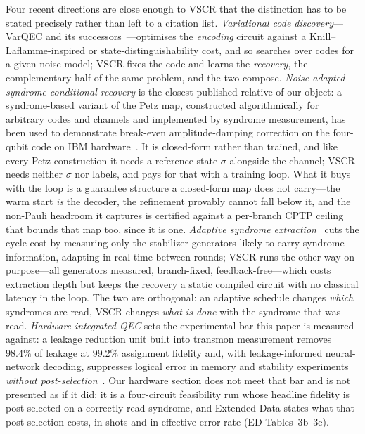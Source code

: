 \documentclass[aps,prxquantum,reprint,superscriptaddress]{revtex4-2}
\begin{document}
Four recent directions are close enough to VSCR that the distinction has to be
stated precisely rather than left to a citation list. \emph{Variational code
discovery}---VarQEC and its successors~\cite{varqec_cao,varqec_meyer}---optimises
the \emph{encoding} circuit against a Knill--Laflamme-inspired or
state-distinguishability cost, and so searches over codes for a given noise
model; VSCR fixes the code and learns the \emph{recovery}, the complementary half
of the same problem, and the two compose. \emph{Noise-adapted syndrome-conditional
recovery} is the closest published relative of our object: a syndrome-based
variant of the Petz map, constructed algorithmically for arbitrary codes and
channels and implemented by syndrome measurement, has been used to demonstrate
break-even amplitude-damping correction on the four-qubit code on IBM
hardware~\cite{biswas_syndrome_petz}. It is closed-form rather than trained, and
like every Petz construction it needs a reference state $\sigma$ alongside the
channel; VSCR needs neither $\sigma$ nor labels, and pays for that with a training
loop. What it buys with the loop is a guarantee structure a closed-form map does
not carry---the warm start \emph{is} the decoder, the refinement provably cannot
fall below it, and the non-Pauli headroom it captures is certified against a
per-branch CPTP ceiling that bounds that map too, since it is one.
\emph{Adaptive syndrome extraction}~\cite{berthusen_ase} cuts the cycle cost by
measuring only the stabilizer generators likely to carry syndrome information,
adapting in real time between rounds; VSCR runs the other way on purpose---all
generators measured, branch-fixed, feedback-free---which costs extraction depth
but keeps the recovery a static compiled circuit with no classical latency in the
loop. The two are orthogonal: an adaptive schedule changes \emph{which} syndromes
are read, VSCR changes \emph{what is done} with the syndrome that was read.
\emph{Hardware-integrated QEC} sets the experimental bar this paper is measured
against: a leakage reduction unit built into transmon measurement removes
$98.4\%$ of leakage at $99.2\%$ assignment fidelity and, with leakage-informed
neural-network decoding, suppresses logical error in memory and stability
experiments \emph{without post-selection}~\cite{xin_lru}. Our hardware section
does not meet that bar and is not presented as if it did: it is a four-circuit
feasibility run whose headline fidelity is post-selected on a correctly read
syndrome, and Extended Data states what that post-selection costs, in shots and
in effective error rate (ED Tables~3b--3e).
\end{document}
